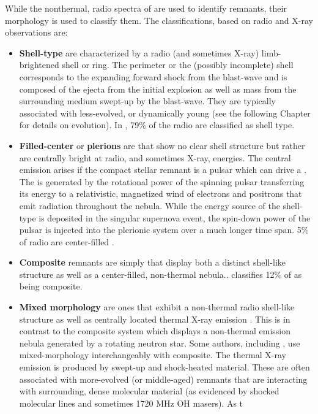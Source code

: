 While the nonthermal, radio \sync{} spectra of  \snrs{} are used to identify remnants, their morphology is used to classify them. The classifications, based on radio and X-ray observations are:
\begin{itemize}
	\item \textbf{ Shell-type} \snrs{} are characterized by a radio (and sometimes X-ray) limb-brightened shell or ring. The perimeter or the (possibly incomplete) shell corresponds to the expanding forward shock from the blast-wave and is composed of the ejecta from the initial explosion as well as mass from the surrounding medium swept-up by the blast-wave. They are typically associated with less-evolved, or dynamically young \snrs{} (see the following Chapter for details on \snr{} evolution). In \cite{Green14}, 79\% of the radio \snrs{} are classified as shell type. 
	
	\item \textbf{Filled-center} \snrs{} or \textbf{plerions} are \snrs{} that show no clear shell structure but  rather are centrally bright at radio, and sometimes X-ray, energies. The central \sync{} emission arises if the  compact stellar remnant is a pulsar which can drive a \pwn{} \cite{Gaensler06}. The \pwn{} is generated by the rotational power of the spinning pulsar transferring its energy to a relativistic, magnetized wind of electrons and positrons that emit \sync{} radiation throughout the nebula. While the energy source of the shell-type \snr{} is deposited in the singular supernova event, the spin-down power of the pulsar is injected into the plerionic system over a much longer time span. 5\% of radio \snrs{} are center-filled \citep{Green14}.
	\item \textbf{Composite} remnants are simply \snrs{} that display both a  distinct shell-like structure as well as a center-filled, non-thermal \sync{} nebula.. \cite{Green14} classifies 12\% of \snrs{} as being composite.
	
	\item \textbf{Mixed morphology} \snrs{} are ones that exhibit a non-thermal radio shell-like structure as well as centrally located thermal X-ray emission \citep{Rho98}. This is in contrast to the composite system which displays a non-thermal emission nebula generated by a rotating neutron star. Some authors, including \cite{Green14}, use mixed-morphology interchangeably with composite. The thermal X-ray emission is produced by swept-up and shock-heated  material. These \snrs{} are often associated with more-evolved (or middle-aged) remnants that are interacting with surrounding, dense molecular material (as evidenced by shocked molecular lines and sometimes 1720 MHz OH masers). As t
\end{itemize}

